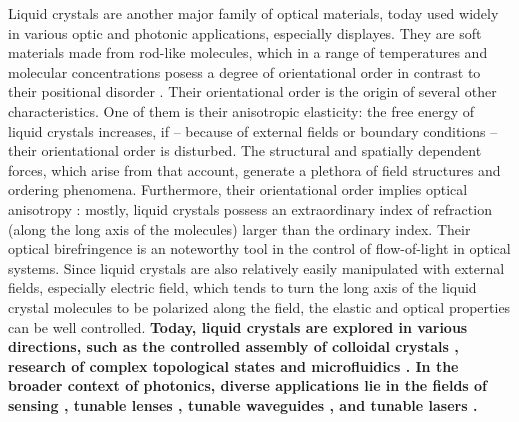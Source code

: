 \documentclass[a4paper,11pt]{article}
\begin{document}

Liquid crystals are another major family of optical materials, today used widely in various optic and photonic applications, especially displayes. 
They are soft materials made from rod-like molecules, which in a range of temperatures and molecular concentrations posess a degree of orientational order in contrast to their positional disorder \cite{degennes}. 
Their orientational order is the origin of several other characteristics. 
One of them is their anisotropic elasticity: the free energy of liquid crystals increases, if -- because of external fields or boundary conditions -- their orientational order is disturbed. 
The structural and spatially dependent forces, which arise from that account, generate a plethora of field structures and ordering phenomena. 
Furthermore, their orientational order implies optical anisotropy \cite{hecht-optics}: mostly, liquid crystals possess an extraordinary index of refraction (along the long axis of the molecules) larger than the ordinary index. 
Their optical birefringence is an noteworthy tool in the control of flow-of-light in optical systems. 
Since liquid crystals are also relatively easily manipulated with external fields, especially electric field, which tends to turn the long axis of the liquid crystal molecules to be polarized along the field, the elastic and optical properties can be well controlled.
{\bfseries Today, liquid crystals are explored in various directions, such as the controlled assembly of colloidal crystals \cite{musevic-2013-colloidal-crystal}, research of complex topological states \cite{smalyukh-2014-knots,zumer-2014-knots} and microfluidics \cite{yeomans-2013-lc-microfluidics}.
In the broader context of photonics, diverse applications lie in the fields of sensing \cite{abbott-2013-sensing}, tunable lenses \cite{lin-2011-lensing}, tunable waveguides \cite{kitzerow-2014-fibres}, and tunable lasers \cite{humar-2016-lasing}. }

\end{document}
